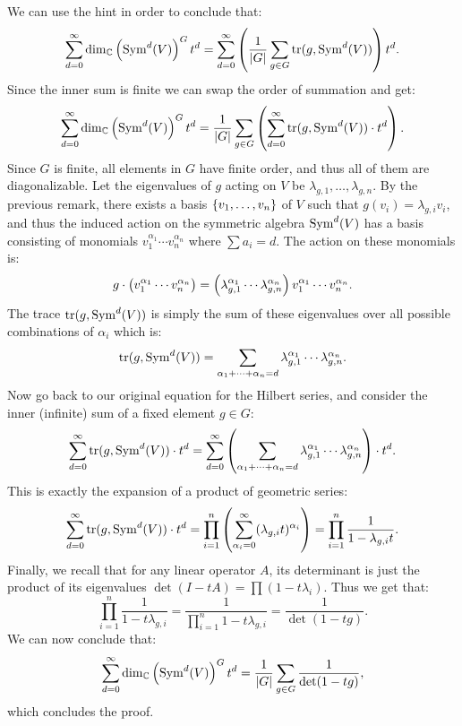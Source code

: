\documentclass[11pt, a4paper]{article}
\begin{document}
\begin{solution}
  We can use the hint in order to conclude that:
  \[
    \sum_{d=0}^{\infty} \dim_{\C} \del{\Sym^d(V)}^G t^d =
    \sum_{d=0}^{\infty} \del{\frac{1}{|G|} \sum_{g \in G} \tr(g,\Sym^d(V))} t^d.
  \]
  Since the inner sum is finite we can swap the order of summation
  and get:
  \[
    \sum_{d=0}^{\infty} \dim_{\C} \del{\Sym^d(V)}^G t^d =
    \frac{1}{|G|} \sum_{g \in G} \del{\sum_{d=0}^{\infty} \tr(g,\Sym^d(V)) \cdot t^d}.
  \]
  Since $G$ is finite, all elements in $G$ have finite order,
  and thus all of them are diagonalizable.
  Let the eigenvalues of $g$ acting on $V$
  be $\lambda_{g,1},\dots,\lambda_{g,n}$.
  By the previous remark, there exists a basis $\left\{v_1,\dots,v_n\right\}$ of $V$
  such that $g(v_i) = \lambda_{g,i} v_i$,
  and thus the induced action on the symmetric algebra $\operatorname{Sym}^d(V)$ has
  a basis consisting of monomials $v_1^{\alpha_1} \cdots v_n^{\alpha_n}$
  where $\sum a_i = d$. The action on these monomials is:
  \[
    g \cdot \del{v_1^{\alpha_1} \cdots v_n^{\alpha_n}} =
    \del{\lambda_{g,1}^{\alpha_1} \cdots \lambda_{g,n}^{\alpha_n}}
      v_1^{\alpha_1} \cdots v_n^{\alpha_n}.
  \]
  The trace $\operatorname{tr}(g,\operatorname{Sym}^d(V))$ is simply the sum of these eigenvalues
  over all possible combinations of $\alpha_i$ which is:
  \[
    \operatorname{tr}(g,\operatorname{Sym}^d(V)) =
    \sum_{\alpha_1 + \cdots + \alpha_n = d}
      \lambda_{g,1}^{\alpha_1} \cdots \lambda_{g,n}^{\alpha_n}.
  \]
  Now go back to our original equation for the Hilbert series,
  and consider the inner (infinite) sum of a fixed element $g \in G$:
  \[
    \sum_{d=0}^{\infty} \tr(g,\Sym^d(V)) \cdot t^d =
    \sum_{d=0}^{\infty} \del{\sum_{\alpha_1 + \cdots + \alpha_n = d}
      \lambda_{g,1}^{\alpha_1} \cdots \lambda_{g,n}^{\alpha_n}} \cdot t^d.
  \]
  This is exactly the expansion of a product of geometric series:
  \[
    \sum_{d=0}^{\infty} \tr(g,\Sym^d(V)) \cdot t^d =
    \prod_{i=1}^{n} \del{\sum_{\alpha_i = 0}^{\infty} (\lambda_{g,i} t)^{\alpha_i}} =
    \prod_{i=1}^{n} \frac{1}{1 - \lambda_{g,i} t}.
  \]
  Finally, we recall that for any linear operator $A$,
  its determinant is just the product of its eigenvalues
  $\det(I - tA) = \prod (1 - t \lambda_i)$.
  Thus we get that:
  \[
    \prod_{i=1}^{n} \frac{1}{1 - t \lambda_{g,i}} =
    \frac{1}{\prod_{i=1}^{n} 1 - t \lambda_{g,i}} =
    \frac{1}{\det(1 - tg)}.
  \]
  We can now conclude that:
  \[
    \sum_{d=0}^{\infty} \dim_{\C} \del{\Sym^d(V)}^G t^d =
    \frac{1}{|G|} \sum_{g \in G} \frac{1}{\det(1 - tg)},
  \]
  which concludes the proof.
\end{solution}
\end{document}
